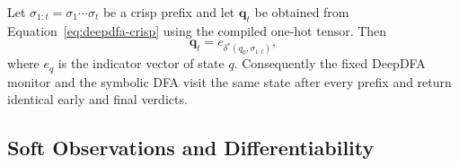 \begin{proposition}
\label{prop:deepdfa-crisp-equivalence}
Let $\sigma_{1:t}=\sigma_1\cdots\sigma_t$ be a crisp prefix and let $\mathbf q_t$ be obtained from Equation~\eqref{eq:deepdfa-crisp} using the compiled one-hot tensor. Then
\[
  \mathbf q_t=e_{\delta^*(q_0,\sigma_{1:t})},
\]
where $e_q$ is the indicator vector of state $q$. Consequently the fixed DeepDFA monitor and the symbolic DFA visit the same state after every prefix and return identical early and final verdicts.
\end{proposition}

\subsection{Soft Observations and Differentiability}
\label{sec:deepdfa-soft}

